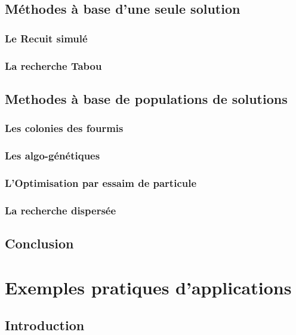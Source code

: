 \documentclass[a4paper,11pt,oneside]{report}
\theoremstyle{plain}
\newcommand{\0}{/ \! \! \! 0}
\theoremstyle{plain}
\begin{document}
 \section{M\'ethodes \`a base d'une seule solution}

\subsection{Le Recuit simul\'e}

\subsection{La recherche Tabou}

\section{Methodes \`a base de populations de solutions}

\subsection{Les colonies des fourmis}

\subsection{Les algo-g\'en\'etiques}

\subsection{L'Optimisation par essaim de particule}

\subsection{La recherche dispers\'ee}

\section{Conclusion}

\chapter{Exemples pratiques d'applications}
\section{Introduction}
\end{document}
